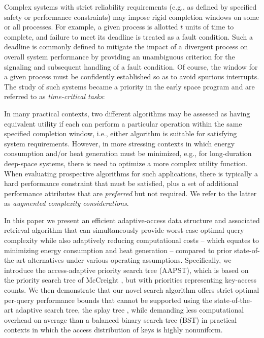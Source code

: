 \documentclass{article}
\begin{document}
Complex systems with strict reliability requirements (e.g., as defined by specified safety or performance constraints) may impose rigid completion windows on some or all processes. For example, a given process is allotted $t$ units of time to complete, and failure to meet its deadline is treated as a fault condition. Such a deadline is commonly defined to mitigate the impact of a divergent process on overall system performance by providing an unambiguous criterion for the signaling and subsequent handling of a fault condition. Of course, the window for a given process must be confidently established so as to avoid spurious interrupts. The study of such systems became a priority in the early space program \cite{nasa} and are referred to as {\em time-critical tasks}:
\begin{quote}
 \cite{tct}
\end{quote}
In many practical contexts, two different algorithms may be assessed as having equivalent utility if each can perform a particular operation within the same specified completion window, i.e., either algorithm is suitable for satisfying system requirements. However, in more stressing contexts in which energy consumption and/or heat generation must be minimized, e.g., for long-duration deep-space systems, there is need to optimize a more complex utility function. 
When evaluating prospective algorithms for such applications, there is typically a hard performance constraint that must be satisfied, plus a set of additional performance attributes that are {\em preferred} but not required. We refer to the latter as {\em augmented complexity considerations}.

In this paper we present an efficient adaptive-access data structure and associated retrieval algorithm that can simultaneously provide worst-case optimal query complexity while also adaptively reducing computational costs -- which equates to minimizing energy consumption and heat generation -- compared to prior state-of-the-art alternatives under various operating assumptions. Specifically, we introduce the access-adaptive priority search tree (AAPST), which is based on the priority search tree of McCreight \cite{pst}, but with priorities representing key-access counts. We then demonstrate that our novel search algorithm offers strict optimal per-query performance bounds that cannot be supported using the state-of-the-art adaptive search tree, the splay tree \cite{splay}, while demanding less computational overhead on average than a balanced binary search tree (BST) in practical contexts in which the access distribution of keys is highly nonuniform.
\end{document}
